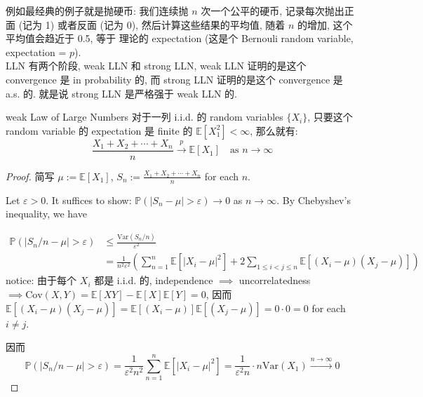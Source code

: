 例如最经典的例子就是抛硬币:
我们连续抛 $n$ 次一个公平的硬币, 
记录每次抛出正面 (记为 1) 或者反面 (记为 0),
然后计算这些结果的平均值, 随着 $n$ 的增加, 
这个平均值会趋近于 0.5, 等于
理论的 expectation (这是个 Bernouli random variable,
 expectation = $p$).\\

LLN 有两个阶段, weak LLN 和 strong LLN,
weak LLN 证明的是这个 convergence 是 in probability 的,
而 strong LLN 证明的是这个 convergence 是 a.s. 的.
就是说 strong LLN 是严格强于 weak LLN 的. 

\begin{theorem}{weak Law of Large Numbers}
\label{weak Law of Large Numbers}
对于一列 i.i.d. 的 random variables \(\{X_i\}\),
只要这个 random variable 的 expectation 是 finite 的
$\mathbb{E}[X_1^2] < \infty$, 
那么就有:
$$ 
\frac{X_1 + X_2 + \cdots + X_n}{n} 
\overset{p}{\longrightarrow} \mathbb{E}[X_1]\quad \text{as   } n \to \infty
$$    
\end{theorem}
\begin{proof}
简写 $\mu:= \mathbb{E}[X_1]$, 
$S_n:= \frac{X_1 + X_2 + \cdots + X_n}{n}$ for each $n$.

Let $\varepsilon > 0$. It suffices 
to show: $\mathbb{P}(|S_n - \mu| > \varepsilon) \to 0$ as $n \to \infty$. 
By Chebyshev's inequality, we have

\begin{align*}
\mathbb{P}\left(\left|S_n / n-\mu\right|
>\varepsilon\right) 
&\leq 
 \frac{\text{Var}(S_n / n)}{\varepsilon^2}\\
& = \frac{1}{n^2 \varepsilon^2} \left( 
\sum_{n=1}^n \mathbb{E}[|X_i - \mu|^2] 
+2 \sum_{1 \leq i < j \leq n} 
\mathbb{E}[(X_i - \mu)(X_j - \mu)]
\right)
\end{align*}
notice: 由于每个 $X_i$ 都是 i.i.d. 的,
independence $\implies$ uncorrelatedness
$\implies \text{Cov}(X,Y) = \mathbb{E}[XY]
-\mathbb{E}[X]\mathbb{E}[Y] = 0$, 
 因而 $\mathbb{E}[(X_i - \mu)(X_j - \mu)] = 
 \mathbb{E}[(X_i - \mu)] \mathbb{E}[(X_j - \mu)] =
 0 \cdot 0 = 0$ for each $i \neq j$. 

因而
$$
\mathbb{P}\left(\left|S_n / n-\mu\right|>\varepsilon\right)
= \frac{1}{\varepsilon^2 n^2} \sum_{n=1}^n \mathbb{E}[|X_i - \mu|^2]
= \frac{1}{\varepsilon^2 n}
\cdot n \text{Var}(X_1)
\overset{n\to \infty}{\rightarrow} 0
$$
\end{proof}

